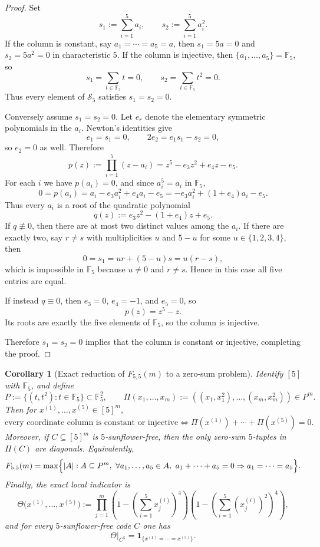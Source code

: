 \documentclass[11pt]{article}
\newtheorem{corollary}[theorem]{Corollary}
\theoremstyle{definition}
\newcommand{\1}{\mathbf{1}}
\begin{document}
\begin{proof}
Set
\[
s_1:=\sum_{i=1}^5 a_i,
\qquad
s_2:=\sum_{i=1}^5 a_i^2.
\]
If the column is constant, say $a_1=\cdots=a_5=a$, then $s_1=5a=0$ and $s_2=5a^2=0$ in characteristic $5$. If the column is injective, then $\{a_1,\dots,a_5\}=\mathbb F_5$, so
\[
s_1=\sum_{t\in \mathbb F_5} t=0,
\qquad
s_2=\sum_{t\in \mathbb F_5} t^2=0.
\]
Thus every element of $\mathcal S_5$ satisfies $s_1=s_2=0$.

Conversely assume $s_1=s_2=0$. Let $e_r$ denote the elementary symmetric polynomials in the $a_i$. Newton's identities give
\[
e_1=s_1=0,
\qquad
2e_2=e_1s_1-s_2=0,
\]
so $e_2=0$ as well. Therefore
\[
p(z):=\prod_{i=1}^5 (z-a_i)=z^5-e_3z^2+e_4z-e_5.
\]
For each $i$ we have $p(a_i)=0$, and since $a_i^5=a_i$ in $\mathbb F_5$,
\[
0=p(a_i)=a_i-e_3a_i^2+e_4a_i-e_5=-e_3a_i^2+(1+e_4)a_i-e_5.
\]
Thus every $a_i$ is a root of the quadratic polynomial
\[
q(z):=e_3z^2-(1+e_4)z+e_5.
\]
If $q\not\equiv 0$, then there are at most two distinct values among the $a_i$. If there are exactly two, say $r\neq s$ with multiplicities $u$ and $5-u$ for some $u\in\{1,2,3,4\}$, then
\[
0=s_1=ur+(5-u)s=u(r-s),
\]
which is impossible in $\mathbb F_5$ because $u\neq 0$ and $r\neq s$. Hence in this case all five entries are equal.

If instead $q\equiv 0$, then $e_3=0$, $e_4=-1$, and $e_5=0$, so
\[
p(z)=z^5-z.
\]
Its roots are exactly the five elements of $\mathbb F_5$, so the column is injective.

Therefore $s_1=s_2=0$ implies that the column is constant or injective, completing the proof.
\end{proof}

\begin{corollary}[Exact reduction of $F_{5,5}(m)$ to a zero-sum problem]\label{cor:555-moment-curve}
Identify $[5]$ with $\mathbb F_5$, and define
\[
P:=\{(t,t^2):t\in \mathbb F_5\}\subset \mathbb F_5^2,
\qquad
\Pi(x_1,\dots,x_m):=((x_1,x_1^2),\dots,(x_m,x_m^2))\in P^m.
\]
Then for $x^{(1)},\dots,x^{(5)}\in [5]^m$,
\[
\text{every coordinate column is constant or injective}
\iff
\Pi(x^{(1)})+\cdots+\Pi(x^{(5)})=0.
\]
Moreover, if $C\subseteq [5]^m$ is $5$-sunflower-free, then the only zero-sum $5$-tuples in $\Pi(C)$ are diagonals. Equivalently,
\[
F_{5,5}(m)=\max\Bigl\{|A|:A\subseteq P^m,\ \forall a_1,\dots,a_5\in A,
\ a_1+\cdots+a_5=0\Rightarrow a_1=\cdots=a_5\Bigr\}.
\]
Finally, the exact local indicator is
\[
\Theta\bigl(x^{(1)},\dots,x^{(5)}\bigr)
:=
\prod_{j=1}^m
\left(1-\left(\sum_{i=1}^5 x^{(i)}_j\right)^4\right)
\left(1-\left(\sum_{i=1}^5 (x^{(i)}_j)^2\right)^4\right),
\]
and for every $5$-sunflower-free code $C$ one has
\[
\Theta\big|_{C^5}=\mathbf 1_{\{x^{(1)}=\cdots=x^{(5)}\}}.
\]
\end{corollary}
\end{document}
